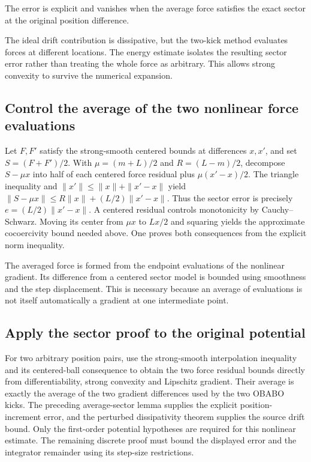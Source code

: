 \documentclass[11pt,a4paper]{report}
\begin{document}
The error is explicit and vanishes when the average force satisfies the exact sector at the original position difference.



The ideal drift contribution is dissipative, but the two-kick method evaluates forces at different locations. The energy estimate isolates the resulting sector error rather than treating the whole force as arbitrary. This allows strong convexity to survive the numerical expansion.

\subsection{\texorpdfstring{Control the average of the two nonlinear force evaluations}{Control the average of the two nonlinear force evaluations}}
\label{report-step-KineticLangevin-OBABOEnergy-lean-3}


Let \(F,F'\) satisfy the strong-smooth centered bounds at differences \(x,x'\), and set \(S=(F+F')/2\). With \(\mu=(m+L)/2\) and \(R=(L-m)/2\), decompose \(S-\mu x\) into half of each centered force residual plus \(\mu(x'-x)/2\). The triangle inequality and \(\|x'\|\le\|x\|+\|x'-x\|\) yield \(\|S-\mu x\|\le R\|x\|+(L/2)\|x'-x\|\). Thus the sector error is precisely \(e=(L/2)\|x'-x\|\). A centered residual controls monotonicity by Cauchy–Schwarz. Moving its center from \(\mu x\) to \(Lx/2\) and squaring yields the approximate cocoercivity bound needed above. One proves both consequences from the explicit norm inequality.



The averaged force is formed from the endpoint evaluations of the nonlinear gradient. Its difference from a centered sector model is bounded using smoothness and the step displacement. This is necessary because an average of evaluations is not itself automatically a gradient at one intermediate point.

\subsection{\texorpdfstring{Apply the sector proof to the original potential}{Apply the sector proof to the original potential}}
\label{report-step-KineticLangevin-OBABOEnergy-lean-4}


For two arbitrary position pairs, use the strong-smooth interpolation inequality and its centered-ball consequence to obtain the two force residual bounds directly from differentiability, strong convexity and Lipschitz gradient. Their average is exactly the average of the two gradient differences used by the two OBABO kicks. The preceding average-sector lemma supplies the explicit position-increment error, and the perturbed dissipativity theorem supplies the source drift bound. Only the first-order potential hypotheses are required for this nonlinear estimate. The remaining discrete proof must bound the displayed error and the integrator remainder using its step-size restrictions.
\end{document}
